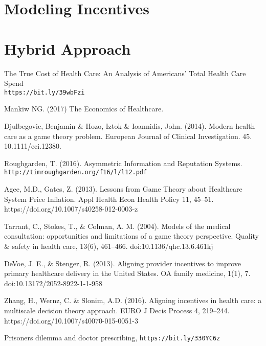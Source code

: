 \documentclass[a4paper]{llncs}
\begin{document}
\section*{Modeling Incentives}

\section*{Hybrid Approach}



\begin{thebibliography}{8}

The True Cost of Health Care: An Analysis of Americans’ Total Health Care Spend
\\\texttt{https://bit.ly/39wbFzi}

Mankiw NG. (2017) The Economics of Healthcare.

Djulbegovic, Benjamin \& Hozo, Iztok \& Ioannidis, John. (2014). Modern health care as a game theory problem. European Journal of Clinical Investigation. 45. 10.1111/eci.12380.

Roughgarden, T. (2016). Asymmetric Information and Reputation Systems. \texttt{http://timroughgarden.org/f16/l/l12.pdf}

Agee, M.D., Gates, Z. (2013). Lessons from Game Theory about Healthcare System Price Inflation. Appl Health Econ Health Policy 11, 45–51. https://doi.org/10.1007/s40258-012-0003-z

Tarrant, C., Stokes, T., \& Colman, A. M. (2004). Models of the medical consultation: opportunities and limitations of a game theory perspective. Quality \& safety in health care, 13(6), 461–466. doi:10.1136/qhc.13.6.461kj

DeVoe, J. E., \& Stenger, R. (2013). Aligning provider incentives to improve primary healthcare delivery in the United States. OA family medicine, 1(1), 7. doi:10.13172/2052-8922-1-1-958

Zhang, H., Wernz, C. \& Slonim, A.D. (2016). Aligning incentives in health care: a multiscale decision theory approach. EURO J Decis Process 4, 219–244. https://doi.org/10.1007/s40070-015-0051-3

Prisoners dilemma and doctor prescribing, \texttt{https://bit.ly/330YC6z}

\end{thebibliography}

\end{document}
